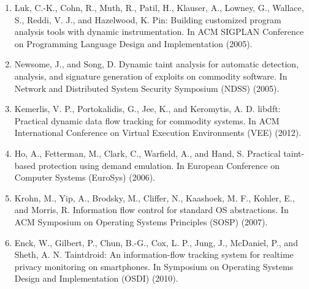 \begin{enumerate}[resume]
\item Luk, C.-K., Cohn, R., Muth, R., Patil, H., Klauser, A., Lowney, G., Wallace, S., Reddi, V. J., and Hazelwood, K. Pin: Building customized program analysis tools with dynamic instrumentation. In ACM SIGPLAN Conference on Programming Language Design and Implementation (2005).
\item  Newsome, J., and Song, D. Dynamic taint analysis for automatic detection, analysis, and signature generation of exploits on commodity software. In Network and Distributed System Security Symposium (NDSS) (2005).
\item Kemerlis, V. P., Portokalidis, G., Jee, K., and Keromytis, A. D. libdft: Practical dynamic data flow tracking for commodity systems. In ACM International Conference on Virtual Execution Environments (VEE) (2012).
\item Ho, A., Fetterman, M., Clark, C., Warfield, A., and Hand, S. Practical taint-based protection using demand emulation. In European Conference on Computer Systems (EuroSys) (2006).
\item Krohn, M., Yip, A., Brodsky, M., Cliffer, N., Kaashoek, M. F., Kohler, E., and Morris, R. Information flow control for standard OS abstractions. In ACM Symposium on Operating Systems Principles (SOSP) (2007).
\item Enck, W., Gilbert, P., Chun, B.-G., Cox, L. P., Jung, J., McDaniel, P., and Sheth, A. N. Taintdroid: An information-flow tracking system for realtime privacy monitoring on smartphones. In Symposium on Operating Systems Design and Implementation (OSDI) (2010).
\end{enumerate}
